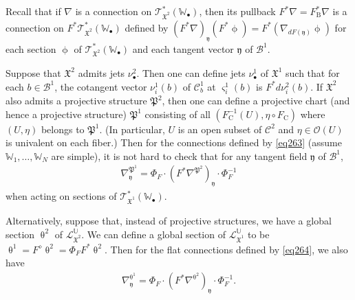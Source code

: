 \documentclass[12pt,b5paper,notitlepage]{report}
\theoremstyle{definition}
\theoremstyle{plain}
\newcommand{\fk}{\mathfrak}
\newcommand{\mc}{\mathcal}
\newcommand{\scr}{\mathscr}
\newcommand{\yk}{\mathfrak y}
\newcommand{\sgm}{\varsigma}
\newcommand{\blt}{\bullet}
\newcommand{\Ubb}{\mathbb U}
\newcommand{\Wbb}{\mathbb W}
\newcommand{\Crm}{\mathrm C}
\newcommand{\Brm}{\mathrm B}
\numberwithin{equation}{section}
\begin{document}
Recall that if $\nabla$ is a connection on $\scr T_{\fk X^2}^*(\Wbb_\blt)$, then its pullback $F^*\nabla=F_\Brm^*\nabla$ is a connection on $F^*\scr T_{\fk X^2}^*(\Wbb_\blt)$ defined by $(F^*\nabla)_{\yk}(F^*\upphi)=F^*(\nabla_{dF(\yk)}\upphi)$ for each section $\upphi$ of $\scr T_{\fk X^2}^*(\Wbb_\blt)$ and each tangent vector $\yk$ of $\mc B^1$. 

Suppose that $\fk X^2$ admits jets $\nu_\blt^2$. Then one can define jets $\nu_\blt^1$ of $\fk X^1$ such that for each $b\in\mc B^1$, the cotangent vector $\nu^1_i(b)$ of $\mc C^1_b$ at $\sgm^1_i(b)$ is $F^*d\nu_i^2(b)$. If $\fk X^2$ also admits a projective structure $\fk P^2$, then one can define a projective chart (and hence a projective structure) $\fk P^1$ consisting of all $(F_\Crm^{-1}(U),\eta\circ F_\Crm)$ where $(U,\eta)$ belongs to $\fk P^1$. (In particular, $U$ is an open subset of $\mc C^2$ and $\eta\in\scr O(U)$ is univalent on each fiber.) Then for the connections defined by \eqref{eq263} (assume $\Wbb_1,\dots,\Wbb_N$ are simple), it is not hard to check that for any tangent field $\yk$ of $\mc B^1$,
\begin{align}
\nabla^{\fk P^1}_\yk=\Phi_F\cdot (F^*\nabla^{\fk P^2})_\yk \cdot \Phi_F^{-1}\label{eq265}
\end{align}
when acting on sections of $\scr T_{\fk X^1}^*(\Wbb_\blt)$.


Alternatively, suppose that, instead of projective structures, we have a global section $\uptheta^2$ of $\scr L_{\fk X^2}^\Ubb$. We can define a global section of $\scr L_{\fk X^1}^\Ubb$ to be $\uptheta^1=F^\diamond\uptheta^2=\Phi_F F^*\uptheta^2$. Then for the flat connections defined by \eqref{eq264}, we also have
\begin{align}
\nabla^{\uptheta^1}_\yk=\Phi_F\cdot (F^*\nabla^{\uptheta^2})_\yk \cdot \Phi_F^{-1}.
\end{align}
\end{document}

